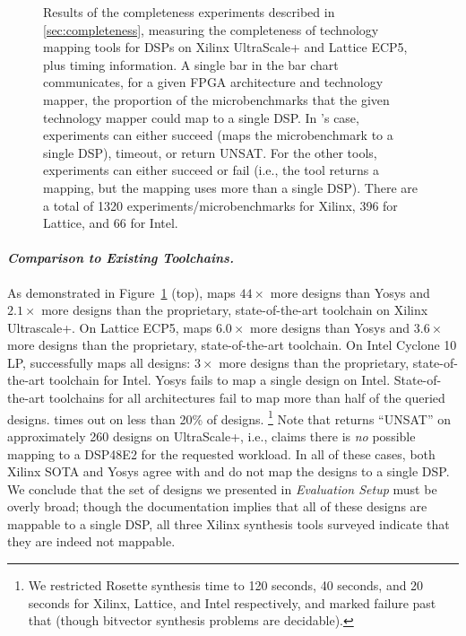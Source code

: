 \begin{figure}
    \caption{
Results of 
  the completeness experiments
  described in \cref{sec:completeness},
  measuring the completeness 
  of technology mapping tools for DSPs on Xilinx UltraScale+ and Lattice ECP5,
  plus timing information.
A single bar in the bar chart
  communicates,
  for a given FPGA architecture
  and technology mapper,
  the proportion of the microbenchmarks
  that the given technology mapper could map to a single DSP.
In \lr's case, experiments can 
  either succeed 
  (\lr maps the microbenchmark
    to a single DSP),
  timeout,
  or return UNSAT.
For the other tools,
  experiments can either
  succeed
  or fail
  (i.e., the tool returns a mapping,
    but the mapping uses more than
    a single DSP).
There are a total of 
  1320 experiments/microbenchmarks for Xilinx,
  396 for Lattice,
  and 66 for Intel.
    }
    \label{fig:xilinx-completeness}
\end{figure}

  
\paragraph{\textnormal{\textit{\textbf{Comparison to Existing Toolchains.}}}}
As demonstrated in Figure~\ref{fig:xilinx-completeness} (top),
  \lr maps $44\times$ more
  designs than Yosys
  and $2.1\times$ more designs
  than the proprietary,
  state-of-the-art toolchain on Xilinx Ultrascale+.
On Lattice ECP5,
  \lr maps $6.0\times$ more
  designs than Yosys 
  and $3.6\times$ more designs
  than the proprietary,
  state-of-the-art toolchain.
On Intel Cyclone 10 LP,
  \lr successfully maps all designs:
  $3\times$ more designs
  than the proprietary,
  state-of-the-art toolchain for Intel.
Yosys fails to map a single design
  on Intel.
State-of-the-art toolchains
  for all architectures fail
  to map more than half
  of the queried designs.
\lr times out on 
less than 20\% of designs.%
\footnote{We restricted Rosette
synthesis time to 
120 seconds, 40 seconds, and 20 seconds for
Xilinx, Lattice, and Intel
respectively, and
marked failure past that (though bitvector synthesis problems
are decidable).}
Note that \lr
  returns ``UNSAT'' on 
  approximately 260
  designs on UltraScale+, i.e., 
  \lr claims there is
  \textit{no} possible mapping
  to a DSP48E2 for the
  requested workload.
In all of these cases,
  both Xilinx SOTA
  and Yosys
  agree with \lr 
  and do not map the designs
  to a single DSP.
We conclude that 
  the set of designs we presented in 
  \textit{Evaluation Setup}
  must be overly broad;
  though the documentation implies
  that all of these designs are mappable
  to a single DSP,
  all three Xilinx synthesis tools 
  surveyed indicate that they are
  indeed not mappable.

